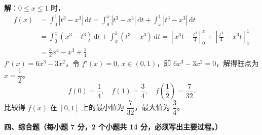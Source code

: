 \documentclass[a4paper,11pt]{ctexart}
\newcommand{\dd}{\,\mathrm{d}}
\begin{document}
\begin{enumerate}[label=\arabic*., start=11, leftmargin=2em, itemsep=0.9em, topsep=0.45em]
  \textbf{解}：$0\le x\le 1$ 时，
  \begin{align*}
    f(x) &= \int_0^1|t^3-x^3|\dd t = \int_0^x|t^3-x^3|\dd t+\int_x^1|t^3-x^3|\dd t \\
         &= \int_0^x(x^3-t^3)\dd t+\int_x^1(t^3-x^3)\dd t
          = \left[x^3 t-\frac{t^4}{4}\right]_0^x + \left[\frac{t^4}{4}-x^3 t\right]_x^1 \\
         &= \frac{3}{2}x^4 - x^3 + \frac{1}{4}.
  \end{align*}
  $f'(x)=6x^3-3x^2$，令 $f'(x)=0,\,x\in(0,1)$，即 $6x^3-3x^2=0$，解得驻点为 $x=\dfrac{1}{2}$。
  \[
    f(0)=\frac{1}{4},\quad f(1)=\frac{3}{4},\quad f\!\left(\frac{1}{2}\right)=\frac{7}{32}.
  \]
  比较得 $f(x)$ 在 $[0,1]$ 上的最小值为 $\dfrac{7}{32}$，最大值为 $\dfrac{3}{4}$。
\end{enumerate}

\vspace{0.6em}

\textbf{四、综合题（每小题 7 分，2 个小题共 14 分，必须写出主要过程。）}
\end{document}
